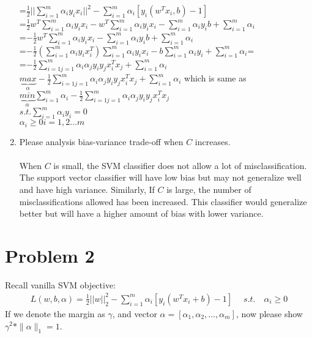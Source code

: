 \documentclass[11pt]{article}
\begin{document}
\begin{enumerate}
\begin{center}
	=$\frac{1}{2}||\sum^m_{i=1}\alpha_i y_i x_i||^2 - \displaystyle\sum^m_{i=1}\alpha_i[y_i(w^T x_i, b) - 1]$\\
	=$\frac{1}{2}w^T \displaystyle\sum^m_{i=1}\alpha_i y_i x_i - w^T \displaystyle\sum^m_{i=1}\alpha_i y_i x_i - \displaystyle\sum^m_{i=1}\alpha_i y_i b + \displaystyle\sum^m_{i=1}\alpha_i$\\
	=$-\frac{1}{2}w^T \displaystyle\sum^m_{i=1}\alpha_i y_i x_i - \displaystyle\sum^m_{i=1}\alpha_i y_i b + \displaystyle\sum^m_{i=1}\alpha_i$\\
	=$-\frac{1}{2}(\displaystyle\sum^m_{i=1}\alpha_i y_i x_i^T) \displaystyle\sum^m_{i=1}\alpha_i y_i x_i - b\displaystyle\sum^m_{i=1}\alpha_i y_i + \displaystyle\sum^m_{i=1}\alpha_i$=\\
	=$-\frac{1}{2}\displaystyle\sum^m_{i=1 j=1}\alpha_i \alpha_j y_i y_j x_i^T x_j +\displaystyle\sum^m_{i=1}\alpha_i$\\
	$\underbrace{max}_{\alpha}-\frac{1}{2}\displaystyle\sum^m_{i=1 j=1}\alpha_i \alpha_j y_i y_j x_i^T x_j +\displaystyle\sum^m_{i=1}\alpha_i$ which is same as\\
	$\underbrace{min}_{\alpha}\displaystyle\sum^m_{i=1}\alpha_i -\frac{1}{2}\displaystyle\sum^m_{i=1 j=1}\alpha_i \alpha_j y_i y_j x_i^T x_j $\\
	$s.t. \displaystyle\sum^m_{i=1}\alpha_i y_i = 0$\\
	$\alpha_i \ge 0 i = 1,2...m$
	
	
	\end{center}
	\item Please analysis bias-variance trade-off when $C$ increases.\\\\ When $C$ is small, the SVM classifier does not allow a lot of misclassification.  The support vector classifier will have low bias but may not generalize well and have high variance. Similarly, If $C$ is large, the number of misclassifications allowed has been increased. This classifier would generalize better but will have a higher amount of bias with lower variance.
\end{enumerate}

\section*{Problem 2}
Recall vanilla SVM objective:
\begin{equation}
\begin{aligned}
L(w,b,\alpha) = \frac{1}{2}||w||_2^2 - \sum\limits_{i=1}^{m}\alpha_i[y_i(w^Tx_i + b) - 1] \; \quad s.t. \quad \alpha_i \geq 0
\end{aligned}
\end{equation}
If we denote the margin as $\gamma$, and vector $\alpha=[\alpha_1, \alpha_2, \dots, \alpha_m]$, now please show $\gamma^2*\|\alpha\|_1=1$.\\
\end{document}
